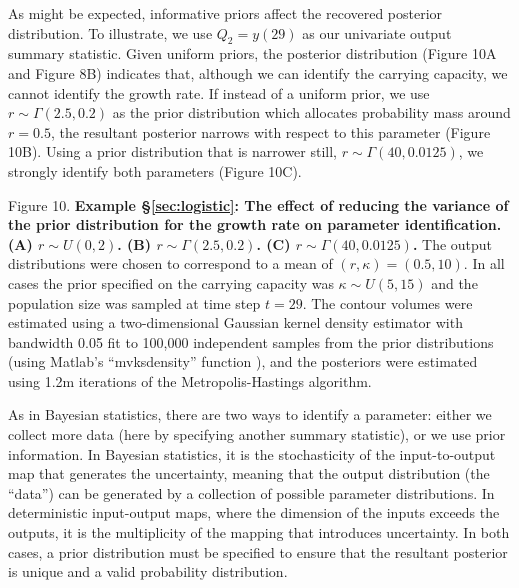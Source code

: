 \documentclass[10pt,letterpaper]{article}
\begin{document}
As might be expected, informative priors affect the recovered posterior distribution. To illustrate, we use $Q_2=y(29)$ as our univariate output summary statistic. Given uniform priors, the posterior distribution (Figure 10A and Figure 8B) indicates that, although we can identify the carrying capacity, we cannot identify the growth rate. If instead of a uniform prior, we use $r\sim \Gamma(2.5,0.2)$ as the prior distribution which allocates probability mass around $r=0.5$, the resultant posterior narrows with respect to this parameter (Figure 10B). Using a prior distribution that is narrower still, $r\sim \Gamma(40,0.0125)$, we strongly identify both parameters (Figure 10C).

\vspace{0.5cm}

Figure 10. {\bf Example \S \ref{sec:logistic}:  The effect of reducing the variance of the prior distribution for the growth rate on parameter identification. (A) $r\sim U(0,2)$. (B) $r\sim \Gamma(2.5,0.2)$. (C) $r\sim \Gamma(40,0.0125)$.} The output distributions were chosen to correspond to a mean of $(r,\kappa)=(0.5,10)$. In all cases the prior specified on the carrying capacity was $\kappa\sim U(5,15)$ and the population size was sampled at time step $t=29$. The contour volumes were estimated using a two-dimensional Gaussian kernel density estimator with bandwidth 0.05 fit to 100,000 independent samples from the prior distributions (using Matlab's ``mvksdensity'' function \cite{MATLAB:2016}), and the posteriors were estimated using 1.2m iterations of the Metropolis-Hastings algorithm.

\vspace{0.5cm}

As in Bayesian statistics, there are two ways to identify a parameter: either we collect more data (here by specifying another summary statistic), or we use prior information. In Bayesian statistics, it is the stochasticity of the input-to-output map that generates the uncertainty, meaning that the output distribution (the ``data'') can be generated by a collection of possible parameter distributions. In deterministic input-output maps, where the dimension of the inputs exceeds the outputs, it is the multiplicity of the mapping that introduces uncertainty. In both cases, a prior distribution must be specified to ensure that the resultant posterior is unique and a valid probability distribution.
\end{document}
